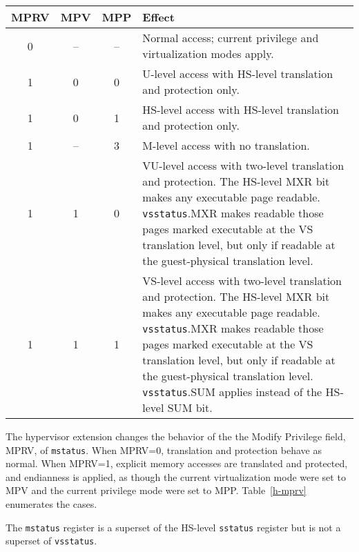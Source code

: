 \begin{table*}[h!]
\begin{center}
\begin{tabular}{|c|c|c||p{4.5in}|}
  \hline
   MPRV & MPV & MPP & Effect \\ \hline \hline
   0    & --  & --  & Normal access; current privilege and virtualization modes apply. \\ \hline
   1    & 0   & 0   & U-level access with HS-level translation and protection only. \\ \hline
   1    & 0   & 1   & HS-level access with HS-level translation and protection only.  \\ \hline
   1    & --  & 3   & M-level access with no translation. \\ \hline
   1    & 1   & 0   & VU-level access with two-level translation and protection. The HS-level MXR bit makes any executable page readable.  {\tt vsstatus}.MXR makes readable those pages marked executable at the VS translation level, but only if readable at the guest-physical translation level. \\ \hline
   1    & 1   & 1   & VS-level access with two-level translation and protection. The HS-level MXR bit makes any executable page readable.  {\tt vsstatus}.MXR makes readable those pages marked executable at the VS translation level, but only if readable at the guest-physical translation level.  {\tt vsstatus}.SUM applies instead of the HS-level SUM bit. \\ \hline
 \end{tabular}
\end{center}
\caption{Effect of MPRV on the translation and protection of explicit
memory accesses.
When MPRV=1, MPP$\neq$3, and {\tt hstatus}.SPRV=1, the effective
privilege is further modified: {\tt hstatus}.SPV applies instead of MPV,
and the HS-level SPP applies instead of MPP.}
\label{h-mprv}
\end{table*}

The hypervisor extension changes the behavior of the the Modify Privilege
field, MPRV, of {\tt mstatus}.
When MPRV=0, translation and protection behave as normal.
When MPRV=1, explicit memory accesses are translated and protected, and
endianness is applied, as though the current virtualization mode were set
to MPV and the current privilege mode were set to MPP.
Table~\ref{h-mprv} enumerates the cases.

The {\tt mstatus} register is a superset of the HS-level {\tt sstatus}
register but is not a superset of {\tt vsstatus}.

